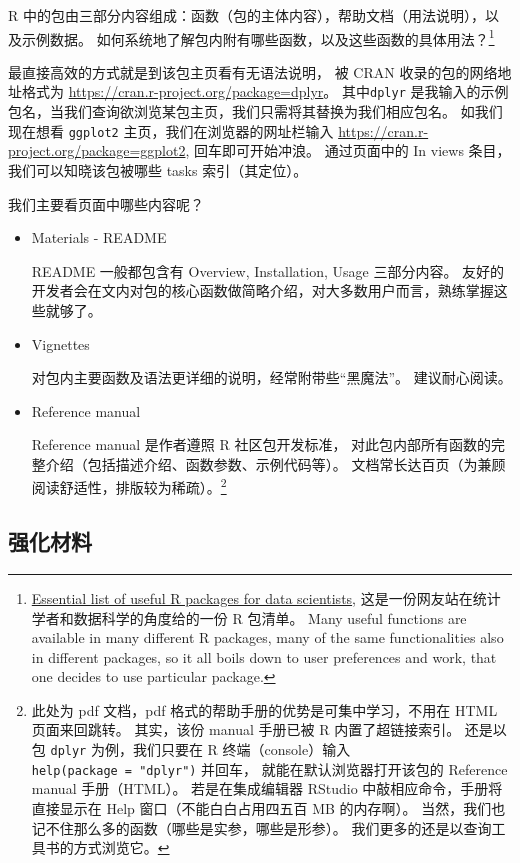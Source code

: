 \documentclass[11pt,hyperref]{ctexart}
\begin{document}
R
中的包由三部分内容组成：函数（包的主体内容），帮助文档（用法说明），以及示例数据。
如何系统地了解包内附有哪些函数，以及这些函数的具体用法？\footnote{\href{https://www.r-bloggers.com/essential-list-of-useful-r-packages-for-data-scientists/}{Essential
  list of useful R packages for data scientists},
  这是一份网友站在统计学者和数据科学的角度给的一份 R 包清单。 Many
  useful functions are available in many different R packages, many of
  the same functionalities also in different packages, so it all boils
  down to user preferences and work, that one decides to use particular
  package.}

最直接高效的方式就是到该包主页看有无语法说明， 被 CRAN
收录的包的网络地址格式为
\url{https://cran.r-project.org/package=dplyr}。 其中\texttt{dplyr}
是我输入的示例包名，当我们查询欲浏览某包主页，我们只需将其替换为我们相应包名。
如我们现在想看 \texttt{ggplot2} 主页，我们在浏览器的网址栏输入
\url{https://cran.r-project.org/package=ggplot2}, 回车即可开始冲浪。
通过页面中的 In views 条目，我们可以知晓该包被哪些 tasks
索引（其定位）。

我们主要看页面中哪些内容呢？

\begin{itemize}
\item
  Materials - README

  README 一般都包含有 Overview, Installation, Usage 三部分内容。
  友好的开发者会在文内对包的核心函数做简略介绍，对大多数用户而言，熟练掌握这些就够了。
\item
  Vignettes

  对包内主要函数及语法更详细的说明，经常附带些``黑魔法''。
  建议耐心阅读。
\item
  Reference manual

  Reference manual 是作者遵照 R 社区包开发标准，
  对此包内部所有函数的完整介绍（包括描述介绍、函数参数、示例代码等）。
  文档常长达百页（为兼顾阅读舒适性，排版较为稀疏）。\footnote{此处为 pdf
    文档，pdf 格式的帮助手册的优势是可集中学习，不用在 HTML
    页面来回跳转。 其实，该份 manual 手册已被 R 内置了超链接索引。
    还是以包 \texttt{dplyr} 为例，我们只要在 R 终端（console）输入
    \texttt{help(package\ =\ "dplyr")} 并回车，
    就能在默认浏览器打开该包的 Reference manual 手册（HTML）。
    若是在集成编辑器 RStudio 中敲相应命令，手册将直接显示在 Help
    窗口（不能白白占用四五百 MB 的内存啊）。
    当然，我们也记不住那么多的函数（哪些是实参，哪些是形参）。
    我们更多的还是以查询工具书的方式浏览它。}
\end{itemize}

\hypertarget{ux5f3aux5316ux6750ux6599}{%
\subsection{强化材料}\label{ux5f3aux5316ux6750ux6599}}
\end{document}
